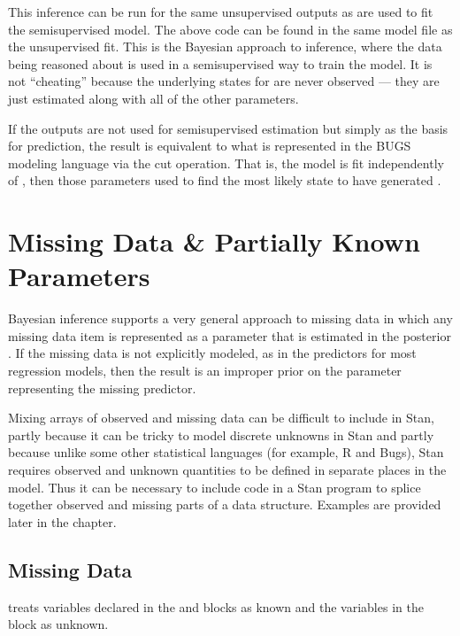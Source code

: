 This inference can be run for the same unsupervised outputs 
as are used to fit the semisupervised model.  The above code can be
found in the same model file as the unsupervised fit.  This is the
Bayesian approach to inference, where the data being reasoned about is
used in a semisupervised way to train the model.  It is not
``cheating'' because the underlying states for  are never
observed --- they are just estimated along with all of the other
parameters.

If the outputs  are not used for semisupervised estimation but
simply as the basis for prediction, the result is equivalent to what
is represented in the BUGS modeling language via the cut operation.
That is, the model is fit independently of , then those
parameters used to find the most likely state to have generated
.


\chapter{Missing Data \& Partially Known Parameters}

\noindent
Bayesian inference supports a very general approach to missing data in
which any missing data item is represented as a parameter that is
estimated in the posterior \citep{GelmanEtAl:2013}.  If the missing
data is not explicitly modeled, as in the predictors for most
regression models, then the result is an improper prior on the
parameter representing the missing predictor.

Mixing arrays of observed and missing data can be difficult to
include in Stan, partly because it can be tricky to model discrete
unknowns in Stan and partly because unlike some other statistical
languages (for example, R and Bugs), Stan requires observed and
unknown quantities to be defined in separate places in the model. Thus
it can be necessary to include code in a Stan program to splice
together observed and missing parts of a data structure.  Examples are
provided later in the chapter.

\section{Missing Data}

\Stan treats variables declared in the  and
 blocks as known and the variables in the
 block as unknown.

